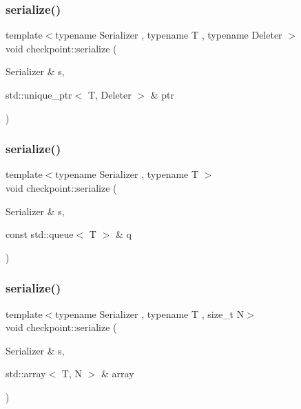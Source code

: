 \mbox{\label{namespacecheckpoint_a617341cb0473cbdce921a3a4d049f4fc}} 
\subsubsection{\texorpdfstring{serialize()}{serialize()}\hspace{0.1cm}{\footnotesize\ttfamily [2/30]}}
{\footnotesize\ttfamily template$<$typename Serializer , typename T , typename Deleter $>$ \\
void checkpoint\+::serialize (\begin{DoxyParamCaption}\item[{Serializer \&}]{s,  }\item[{std\+::unique\+\_\+ptr$<$ T, Deleter $>$ \&}]{ptr }\end{DoxyParamCaption})}

\mbox{\label{namespacecheckpoint_a5621e2549443d76acad6c83fdfdcbeab}} 
\subsubsection{\texorpdfstring{serialize()}{serialize()}\hspace{0.1cm}{\footnotesize\ttfamily [3/30]}}
{\footnotesize\ttfamily template$<$typename Serializer , typename T $>$ \\
void checkpoint\+::serialize (\begin{DoxyParamCaption}\item[{Serializer \&}]{s,  }\item[{const std\+::queue$<$ T $>$ \&}]{q }\end{DoxyParamCaption})}

\mbox{\label{namespacecheckpoint_a976e83bf5f22b7bfc5036fd829be039e}} 
\subsubsection{\texorpdfstring{serialize()}{serialize()}\hspace{0.1cm}{\footnotesize\ttfamily [4/30]}}
{\footnotesize\ttfamily template$<$typename Serializer , typename T , size\+\_\+t N$>$ \\
void checkpoint\+::serialize (\begin{DoxyParamCaption}\item[{Serializer \&}]{s,  }\item[{std\+::array$<$ T, N $>$ \&}]{array }\end{DoxyParamCaption})}

